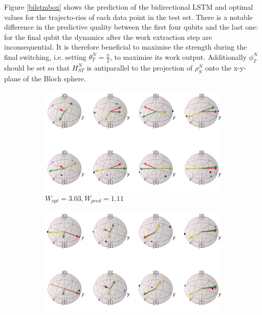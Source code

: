 Figure \ref{bilstmbox} shows the prediction of the bidirectional LSTM and optimal values for the trajecto-ries of each data point in the test set.
There is a notable difference in the predictive quality between the first four qubits and the last one: for the final qubit the dynamics after the work extraction step are inconsequential.
It is therefore beneficial to maximise the strength during the final switching, i.e. setting $\theta_T^N = \frac{\pi}{2}$, to maximise its work output.
Additionally $\phi_T^N$ should be set so that $H_{ST}^N$ is antiparallel to the projection of $\rho_S^N$ onto the x-y-plane of the Bloch sphere.

\newpage

\begin{figure}[H]
	\centering
	\begin{subfigure}{0.85\textwidth}
		\centering
		\includegraphics[width=\textwidth]{img/bloch_10553_crop_sphere}
		\caption{$W_{opt} = 3.03, W_{pred} = 1.11$}
		\label{bloch_10553}
	\end{subfigure}
	\begin{subfigure}{0.85\textwidth}
		\centering
		\includegraphics[width=\textwidth]{img/bloch_worst_crop_sphere}

\end{subfigure}
\end{figure}
